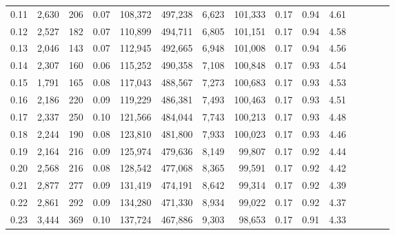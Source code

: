 \begin{tabular}{rrrcrrrrrrrrrrr}
0.11 &   2,630 &     206 &                                       0.07 &  108,372 &  497,238 &    6,623 &  101,333 &  0.17 &  0.94 &                         4.61 \\
0.12 &   2,527 &     182 &                                       0.07 &  110,899 &  494,711 &    6,805 &  101,151 &  0.17 &  0.94 &                         4.58 \\
0.13 &   2,046 &     143 &                                       0.07 &  112,945 &  492,665 &    6,948 &  101,008 &  0.17 &  0.94 &                         4.56 \\
0.14 &   2,307 &     160 &                                       0.06 &  115,252 &  490,358 &    7,108 &  100,848 &  0.17 &  0.93 &                         4.54 \\
0.15 &   1,791 &     165 &                                       0.08 &  117,043 &  488,567 &    7,273 &  100,683 &  0.17 &  0.93 &                         4.53 \\
0.16 &   2,186 &     220 &                                       0.09 &  119,229 &  486,381 &    7,493 &  100,463 &  0.17 &  0.93 &                         4.51 \\
0.17 &   2,337 &     250 &                                       0.10 &  121,566 &  484,044 &    7,743 &  100,213 &  0.17 &  0.93 &                         4.48 \\
0.18 &   2,244 &     190 &                                       0.08 &  123,810 &  481,800 &    7,933 &  100,023 &  0.17 &  0.93 &                         4.46 \\
0.19 &   2,164 &     216 &                                       0.09 &  125,974 &  479,636 &    8,149 &   99,807 &  0.17 &  0.92 &                         4.44 \\
0.20 &   2,568 &     216 &                                       0.08 &  128,542 &  477,068 &    8,365 &   99,591 &  0.17 &  0.92 &                         4.42 \\
0.21 &   2,877 &     277 &                                       0.09 &  131,419 &  474,191 &    8,642 &   99,314 &  0.17 &  0.92 &                         4.39 \\
0.22 &   2,861 &     292 &                                       0.09 &  134,280 &  471,330 &    8,934 &   99,022 &  0.17 &  0.92 &                         4.37 \\
0.23 &   3,444 &     369 &                                       0.10 &  137,724 &  467,886 &    9,303 &   98,653 &  0.17 &  0.91 &                         4.33 \\

\end{tabular}
